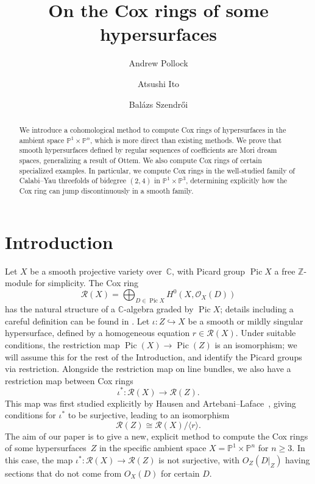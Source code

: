 \documentclass[a4paper,11pt]{amsart}
\title{On the Cox rings of some hypersurfaces}
\theoremstyle{plain}
\theoremstyle{definition}
\newcommand{\C}{\mathbb{C}}
\newcommand{\p}{\mathbb{P}}
\newcommand{\R}{\mathcal{R}}
\newcommand{\Z}{\mathbb{Z}}
\newcommand{\Ox}{\mathcal{O}}
\DeclareMathOperator{\Pic}{Pic}
\begin{document}
\author{Andrew Pollock}
\address{University of Vienna, Austria}

\author{Atsushi Ito}
\address{Tsukuba University, Japan}

\author{Bal\'{a}zs Szendr\H{o}i}
\address{University of Vienna, Austria}

\begin{abstract}
\noindent We introduce a cohomological method to compute Cox rings of hypersurfaces in the ambient space $\p^1 \times \p^n$, which is more direct than existing methods. We prove that smooth hypersurfaces defined by regular sequences of coefficients are Mori dream spaces, generalizing a result of Ottem. We also compute Cox rings of certain specialized examples. In particular, we compute Cox rings in the well-studied family of Calabi--Yau threefolds of bidegree $(2,4)$ in $\p^1 \times \p^3$, determining explicitly how the Cox ring can jump discontinuously in a smooth family. 
\end{abstract}

\maketitle

\thispagestyle{empty}

\section*{Introduction}

Let $X$ be a smooth projective variety over~$\C$, with Picard group $\Pic X$ a free $\Z$-module for simplicity. The Cox ring 
\begin{equation*}
    \R(X) = \bigoplus_{D \in \Pic X} H^0(X,\Ox_X(D))
\end{equation*}
has the natural structure of a $\C$-algebra graded by $\Pic X$; details including a careful definition can be found in \cite{CoxBook}. Let $\iota\colon Z\hookrightarrow X$ be a smooth or mildly singular hypersurface, defined by a homogeneous equation $r\in 
\R(X)$. Under suitable conditions, the restriction map $\Pic(X)\to\Pic(Z)$
is an isomorphism; we will assume this for the rest of the Introduction, and identify the Picard groups via restriction. 
Alongside the restriction map on line bundles, we also have a restriction map between Cox rings
\[\iota^*\colon \R(X)\to \R(Z). 
\]
This map was first studied explicitly by Hausen and Artebani--Laface~\cite{hausen, AL}, giving conditions for $\iota^*$ to be surjective, leading to an isomorphism
\[\R(Z) \cong \R(X)/\langle r \rangle.\]
The aim of our paper is to give a new, explicit method to compute the Cox rings of some hypersurfaces~$Z$ in the specific ambient space $X = \p^1 \times \p^n$ for $n\geq 3$. In this case, the map $\iota^*\colon \R(X)\to \R(Z)$ is not surjective, with $O_Z(D|_Z)$ having sections that do not come from $O_X(D)$ for certain $D$.
\end{document}

